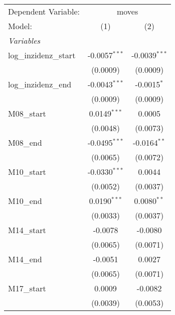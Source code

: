 \documentclass[10pt,a4paper]{article}
\author{Peer Lasse Hinrichsen}
\begin{document}
\begingroup
\centering
\begin{tabular}{lcc}
   \tabularnewline \midrule \midrule
   Dependent Variable: & \multicolumn{2}{c}{moves}\\
   Model:                                           & (1)             & (2)\\  
   \midrule
   \emph{Variables}\\
   log\_inzidenz\_start                             & -0.0057$^{***}$ & -0.0039$^{***}$\\   
                                                    & (0.0009)        & (0.0009)\\   
   log\_inzidenz\_end                               & -0.0043$^{***}$ & -0.0015$^{*}$\\   
                                                    & (0.0009)        & (0.0009)\\   
   M08\_start                                       & 0.0149$^{***}$  & 0.0005\\   
                                                    & (0.0048)        & (0.0073)\\   
   M08\_end                                         & -0.0495$^{***}$ & -0.0164$^{**}$\\   
                                                    & (0.0065)        & (0.0072)\\   
   M10\_start                                       & -0.0330$^{***}$ & 0.0044\\   
                                                    & (0.0052)        & (0.0037)\\   
   M10\_end                                         & 0.0190$^{***}$  & 0.0080$^{**}$\\   
                                                    & (0.0033)        & (0.0037)\\   
   M14\_start                                       & -0.0078         & -0.0080\\   
                                                    & (0.0065)        & (0.0071)\\   
   M14\_end                                         & -0.0051         & 0.0027\\   
                                                    & (0.0065)        & (0.0071)\\   
   M17\_start                                       & 0.0009          & -0.0082\\   
                                                    & (0.0039)        & (0.0053)\\   

\end{tabular}
\end{document}
